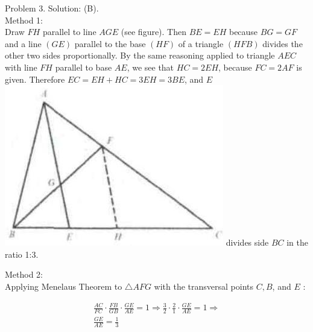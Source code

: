 \documentclass[10pt]{article}
\begin{document}
Problem 3. Solution: (B).\\
Method 1:\\
Draw \(F H\) parallel to line \(A G E\) (see figure). Then \(B E=E H\) because \(B G=G F\) and a line \((G E)\) parallel to the base \((H F)\) of a triangle \((H F B)\) divides the other two sides proportionally. By the same reasoning applied to triangle \(A E C\) with line \(F H\) parallel to base \(A E\), we see that \(H C=2 E H\), because \(F C=2 A F\) is given. Therefore \(E C=E H+H C=3 E H=3 B E\), and \(E\)\\
\includegraphics[max width=\textwidth]{2025_04_17_97bc1f7e44d93c271a88g-132} divides side \(B C\) in the ratio 1:3.

Method 2:\\
Applying Menelaus Theorem to \(\triangle A F G\) with the transversal points \(C, B\), and \(E\) :

\[
\begin{gathered}
\frac{A C}{F C} \cdot \frac{F B}{G B} \cdot \frac{G E}{A E}=1 \Rightarrow \frac{3}{2} \cdot \frac{2}{1} \cdot \frac{G E}{A E}=1 \Rightarrow \\
\frac{G E}{A E}=\frac{1}{3}
\end{gathered}
\]
\end{document}
